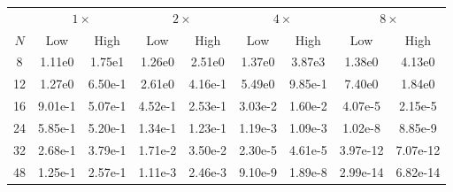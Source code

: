 \begin{table}[htpb]
\begin{tabular}{c|cc|cc|cc|cc|}
 & \multicolumn{2}{c|}{$1 \times$} 
 & \multicolumn{2}{c|}{$2 \times$}
 & \multicolumn{2}{c|}{$4 \times$}
 & \multicolumn{2}{c|}{$8 \times$} \\
 $N$ & Low & High & Low & High & Low & High & Low & High \\
 \hline
 8  & 1.11e0  & 1.75e1
    & 1.26e0  & 2.51e0
    & 1.37e0  & 3.87e3
    & 1.38e0  & 4.13e0
    \\
 12 & 1.27e0  & 6.50e-1
    & 2.61e0  & 4.16e-1
    & 5.49e0  & 9.85e-1
    & 7.40e0  & 1.84e0
    \\
 16 & 9.01e-1  & 5.07e-1
    & 4.52e-1  & 2.53e-1
    & 3.03e-2  & 1.60e-2
    & 4.07e-5  & 2.15e-5
    \\
 24 & 5.85e-1  & 5.20e-1
    & 1.34e-1  & 1.23e-1
    & 1.19e-3  & 1.09e-3
    & 1.02e-8  & 8.85e-9
    \\
 32 & 2.68e-1  & 3.79e-1
    & 1.71e-2  & 3.50e-2
    & 2.30e-5  & 4.61e-5
    & 3.97e-12 & 7.07e-12
    \\
 48 & 1.25e-1  & 2.57e-1
    & 1.11e-3  & 2.46e-3
    & 9.10e-9  & 1.89e-8
    & 2.99e-14 & 6.82e-14
\end{tabular}



\end{table}


